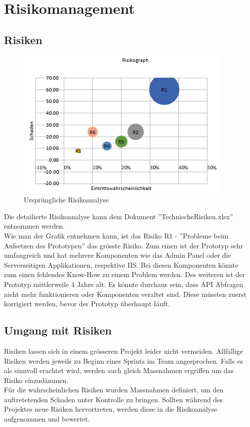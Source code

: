 \section{Risikomanagement}

\subsection{Risiken}
\begin{figure}[H]
	\includegraphics[width=\textwidth,height=\textheight,keepaspectratio]{images/risikoanalyse_vorher.png}
	\caption{Ursprüngliche Risikoanalyse}
\end{figure}

\noindent Die detailierte Risikoanalyse kann dem Dokument ''TechnischeRisiken.xlsx'' entnommen werden.\\
Wie man der Grafik entnehmen kann, ist das Risiko R1 - ''Probleme beim Aufsetzen des Prototypen'' das grösste Risiko. Zum einen ist der Prototyp sehr umfangreich und hat mehrere Komponenten wie das Admin Panel oder die Serverseitigen Applikationen, respektive IIS. Bei diesen Komponenten könnte zum einen fehlendes Know-How zu einem Problem werden. Des weiteren ist der Prototyp mittlerweile 4 Jahre alt. Es könnte durchaus sein, dass API Abfragen nicht mehr funktionieren oder Komponenten veraltet sind. Diese müssten zuerst korrigiert werden, bevor der Prototyp überhaupt läuft.

\subsection{Umgang mit Risiken}
Risiken lassen sich in einem grösseren Projekt leider nicht vermeiden. Allfällige Risiken werden jeweils zu Beginn eines Sprints im Team angesprochen. Falls es als sinnvoll erachtet wird, werden auch gleich Massnahmen ergriffen um das Risiko einzudämmen.\\
Für die wahrscheinlichen Risiken wurden Massnahmen definiert, um den auftretetenden Schaden unter Kontrolle zu bringen. Sollten während des Projektes neue Risiken hervortreten, werden diese in die Risikoanalyse aufgenommen und bewertet.

